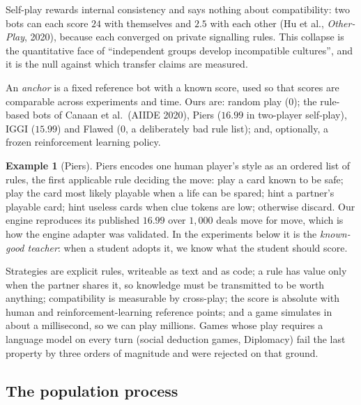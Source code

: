 \documentclass[11pt]{article}
\numberwithin{theorem}{section}
\theoremstyle{definition}
\newtheorem{example}[theorem]{Example}
\theoremstyle{problemstyle}
\begin{document}
\begin{remark}
Self-play rewards internal consistency and says nothing about compatibility: two bots can each score $24$ with
themselves and $2.5$ with each other (Hu et al., \emph{Other-Play}, 2020), because each converged on private
signalling rules. This collapse is the quantitative face of ``independent groups develop incompatible cultures'', and
it is the null against which transfer claims are measured.
\end{remark}

\begin{definition}[Anchors]
An \emph{anchor} is a fixed reference bot with a known score, used so that scores are comparable across experiments
and time. Ours are: random play ($0$); the rule-based bots of Canaan et al.\ (AIIDE 2020), Piers ($16.99$ in two-player
self-play), IGGI ($15.99$) and Flawed ($0$, a deliberately bad rule list); and, optionally, a frozen reinforcement
learning policy.
\end{definition}

\begin{example}[Piers]
Piers encodes one human player's style as an ordered list of rules, the first applicable rule deciding the move: play a
card known to be safe; play the card most likely playable when a life can be spared; hint a partner's playable card;
hint useless cards when clue tokens are low; otherwise discard. Our engine reproduces its published $16.99$ over
$1{,}000$ deals move for move, which is how the engine adapter was validated. In the experiments below it is the
\emph{known-good teacher}: when a student adopts it, we know what the student should score.
\end{example}

\begin{remark}
Strategies are explicit rules, writeable as text and as code; a rule has value only when the partner shares it, so
knowledge must be transmitted to be worth anything; compatibility is measurable by cross-play; the score is absolute
with human and reinforcement-learning reference points; and a game simulates in about a millisecond, so we can play
millions. Games whose play requires a language model on every turn (social deduction games, Diplomacy) fail the last
property by three orders of magnitude and were rejected on that ground.
\end{remark}

\subsection{The population process}
\end{document}
